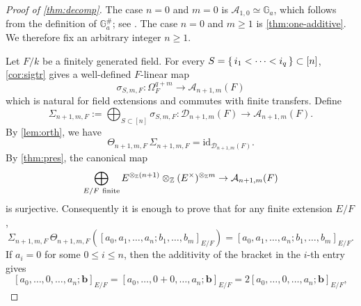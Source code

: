 \documentclass[a4paper,12pt,reqno]{amsart}
\numberwithin{equation}{section}
\theoremstyle{definition}
\newcommand{\Z}{\mathbb{Z}}
\newcommand{\Ga}{\mathbb{G}_{a}}
\newcommand{\Id}{\mathrm{id}}
\renewcommand{\d}{\mathrm{d}}
\newcommand{\Acal}{\mathcal{A}}
\newcommand{\Dcal}{\mathcal{D}}
\newcommand{\GaSharp}{\mathbb{G}_{a}^{\#}}
\newcommand{\vb}{\mathbf{b}}
\begin{document}
\begin{proof}[Proof of \autoref{thm:decomp}]
The case $n=0$ and $m=0$ is $\Acal_{1,0}\simeq\Ga$,
which follows from the definition of $\GaSharp$; see
\cite[Section~5.1]{RSY22}.  
The case $n=0$ and $m\geq 1$ is \autoref{thm:one-additive}.
We therefore fix an arbitrary integer $n\geq1$.  

Let $F/k$ be a finitely generated field.  For every
$S=\set{i_1<\cdots<i_q}\subset[n]$, \autoref{cor:sigtr} gives a
well-defined $F$-linear map
\[
 \sigma_{S,m,F}:\Omega_F^{q+m}\to\Acal_{n+1,m}(F)
\]
which is natural for field extensions and commutes with finite transfers.
Define
\[
 \Sigma_{n+1,m,F}
 :=
 \bigoplus_{S\subset[n]}\sigma_{S,m,F}:
 \Dcal_{n+1,m}(F)\to\Acal_{n+1,m}(F).
\]
By \autoref{lem:orth}, we have 
\begin{equation}\label{eq:leftn-proof}
 \Theta_{n+1,m,F}\,\Sigma_{n+1,m,F}
 =
 \Id_{\Dcal_{n+1,m}(F)}.
\end{equation}
By \autoref{thm:pres}, the canonical
map
\[
 \bigoplus_{E/F\ {\rm finite}}E^{\otimes_{\Z}(n+1)}\otimes_\Z (E^\times)^{\otimes_{\Z}m}
 \to 
 \Acal_{n+1,m}(F)
\]
is surjective.  Consequently it is enough to prove that for any finite extension $E/F$,
\[
 \Sigma_{n+1,m,F}\,\Theta_{n+1,m,F}([a_0,a_1,\ldots,a_n;b_1,\dots,b_m]_{E/F})=[a_0,a_1,\ldots,a_n;b_1,\dots,b_m]_{E/F}.
\]
If $a_i=0$ for some $0\leq i\leq n$, then the additivity of the bracket
in the $i$-th entry gives
\[
 [a_0,\ldots,0,\ldots,a_n;\vb]_{E/F}
 =
 [a_0,\ldots,0+0,\ldots,a_n;\vb]_{E/F}
 =
 2[a_0,\ldots,0,\ldots,a_n;\vb]_{E/F},
\]
\end{proof}
\end{document}
